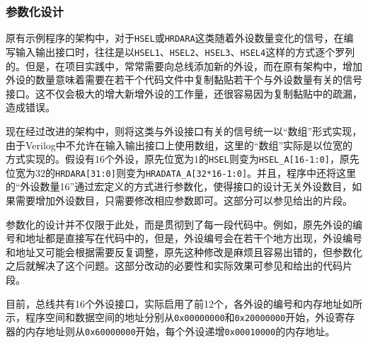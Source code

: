 \subsubsection{参数化设计}
原有示例程序的架构中，对于\texttt{HSEL}或\texttt{HRDARA}这类随着外设数量变化的信号，在编写输入输出接口时，往往是以\texttt{HSEL1}、\texttt{HSEL2}、\texttt{HSEL3}、\texttt{HSEL4}这样的方式逐个罗列的。但是，在项目实践中，常常需要向总线添加新的外设，而在原有架构中，增加外设的数量意味着需要在若干个代码文件中复制黏贴若干个与外设数量有关的信号接口。这不仅会极大的增大新增外设的工作量，还很容易因为复制黏贴中的疏漏，造成错误。

现在经过改进的架构中，则将这类与外设接口有关的信号统一以“数组”形式实现，由于Verilog中不允许在输入输出接口上使用数组，这里的“数组”实际是以位宽的方式实现的。假设有$16$个外设，原先位宽为$1$的\texttt{HSEL}则变为\texttt{HSEL\_A[16-1:0]}，原先位宽为$32$的\texttt{HRDARA[31:0]}则变为\texttt{HRADATA\_A[32*16-1:0]}。并且，程序中还将这里的“外设数量16”通过宏定义的方式进行参数化，使得接口的设计无关外设数目，如果需要增加外设数目，只需要修改相应参数即可。这部分可以参见给出的片段。



参数化的设计并不仅限于此处，而是贯彻到了每一段代码中。例如，原先外设的编号和地址都是直接写在代码中的，但是，外设编号会在若干个地方出现，外设编号和地址又可能会根据需要反复调整，原先这种修改是麻烦且容易出错的，但参数化之后就解决了这个问题。这部分改动的必要性和实际效果可参见和给出的代码片段。





目前，总线共有16个外设接口，实际启用了前12个，各外设的编号和内存地址如所示，程序空间和数据空间的地址分别从\texttt{0x00000000}和\texttt{0x20000000}开始，外设寄存器的内存地址则从\texttt{0x60000000}开始，每个外设递增\texttt{0x00010000}的内存地址。

